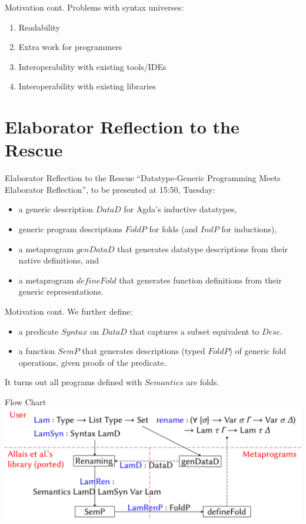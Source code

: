\documentclass[10pt,xcolor=svgnames,aspectratio=169]{beamer} %
\newcommand{\mi}[1]{\ensuremath{\mathit{#1}}}
\begin{document}
\begin{frame}[fragile]{Motivation cont.}
	Problems with syntax universes:
	\pause
	\begin{enumerate}
		\item Readability
		\pause
		\item Extra work for programmers
		\pause
		\item Interoperability with existing tools/IDEs
		\pause
		\item Interoperability with existing libraries
	\end{enumerate}
\end{frame}

\section{Elaborator Reflection to the Rescue}

\begin{frame}[fragile]{Elaborator Reflection to the Rescue}
	``Datatype-Generic Programming Meets Elaborator Reflection'', to be presented at 15:50, Tuesday:
	\pause
	\begin{itemize}
		\item a generic description \mi{DataD} for Agda's inductive datatypes,
		\pause
		\item generic program descriptions \mi{FoldP} for folds (and \mi{IndP} for inductions),
		\pause
		\item a metaprogram \mi{genDataD} that generates datatype descriptions from their native definitions, and 
		\pause
		\item a metaprogram \mi{defineFold} that generates function definitions from their generic representations.
	\end{itemize}
\end{frame}

\begin{frame}[fragile]{Motivation cont.}
	We further define:
	\begin{itemize}
		\item a predicate \mi{Syntax} on \mi{DataD} that captures a subset equivalent to \mi{Desc}.
		\item a function \mi{SemP} that generates descriptions (typed \mi{FoldP}) of generic fold operations, given proofs of the predicate.
	\end{itemize}
It turns out all programs defined with \mi{Semantics} are folds.
\end{frame}

\begin{frame}[fragile]{Flow Chart}
\includegraphics[width=\columnwidth]{Diagram.pdf}
\end{frame}
\end{document}
